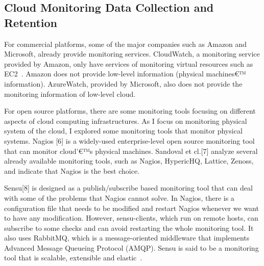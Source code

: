 \subsection{Cloud Monitoring Data Collection and Retention}

For commercial platforms, some of the major companies such as Amazon and Microsoft, already provide monitoring services. CloudWatch, a monitoring service provided by Amazon, only have services of monitoring virtual resources such as EC2~\cite{Aceto2013}. Amazon does not provide low-level information (physical machines€™ information). AzureWatch, provided by Microsoft, also does not provide the monitoring information of low-level cloud. 

  For open source platforms, there are some monitoring tools focusing on different aspects of cloud computing infrastructures. As I focus on monitoring physical system of the cloud, I explored some monitoring tools that monitor physical systems. Nagios [6] is a widely-used enterprise-level open source monitoring tool that can monitor cloud'€™s physical machines. Sandoval et cl.[7] analyze several already available monitoring tools, such as Nagios, HypericHQ, Lattice, Zenoss, and indicate that Nagios is the best choice. 

  Sensu[8] is designed as a publish/subscribe based monitoring tool that can deal with some of the problems that Nagios cannot solve. In Nagios, there is a configuration file that needs to be modified and restart Nagios whenever we want to have any modification. However, sensu-clients, which run on remote hosts, can subscribe to some checks and can avoid restarting the whole monitoring tool. It also uses RabbitMQ, which is a message-oriented middleware that implements Advanced Message Queueing Protocol (AMQP). Sensu is said to be a monitoring tool that is scalable, extensible and elastic~\cite{Aceto2013}. 